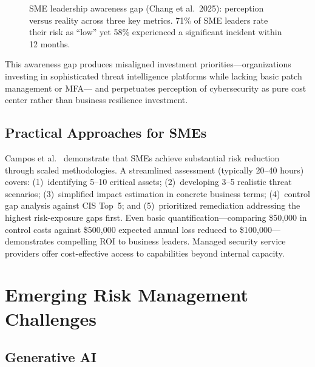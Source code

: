 \documentclass[journal]{IEEEtran}
\begin{document}
\begin{figure}[!t]
\caption{SME leadership awareness gap (Chang et al.\ 2025): perception versus
  reality across three key metrics. 71\% of SME leaders rate their risk as
  ``low'' yet 58\% experienced a significant incident within 12 months.}
\label{fig:awareness_gap}
\end{figure}

This awareness gap produces misaligned investment priorities---organizations investing in
sophisticated threat intelligence platforms while lacking basic patch management or MFA---
and perpetuates perception of cybersecurity as pure cost center rather than business
resilience investment.

\subsection{Practical Approaches for SMEs}

Campos et al.~\cite{campos2025safeguarding} demonstrate that SMEs achieve substantial
risk reduction through scaled methodologies. A streamlined assessment (typically 20--40
hours) covers: (1)~identifying 5--10 critical assets; (2)~developing 3--5 realistic
threat scenarios; (3)~simplified impact estimation in concrete business terms; (4)~control
gap analysis against CIS Top~5; and (5)~prioritized remediation addressing the highest
risk-exposure gaps first. Even basic quantification---comparing \$50,000 in control costs
against \$500,000 expected annual loss reduced to \$100,000---demonstrates compelling ROI
to business leaders. Managed security service providers offer cost-effective access to
capabilities beyond internal capacity.

\section{Emerging Risk Management Challenges}

\subsection{Generative AI}
\end{document}
